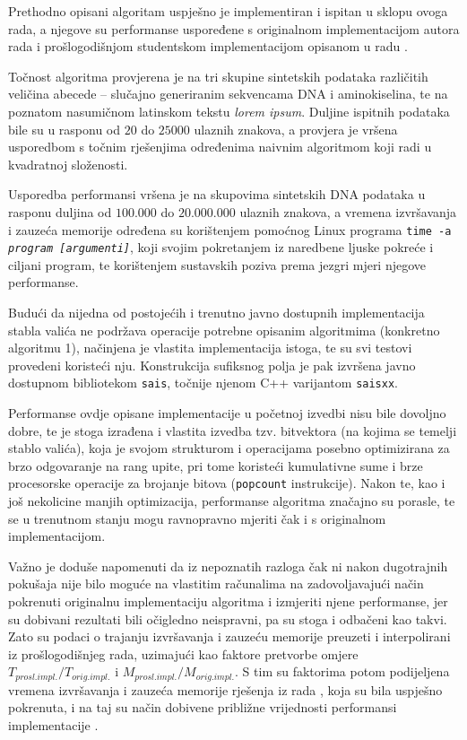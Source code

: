 \documentclass[a4paper,12pt]{article}
\begin{document}
Prethodno opisani algoritam uspješno je implementiran i ispitan u sklopu ovoga rada, a njegove su performanse uspoređene s originalnom implementacijom autora rada \cite{beller2013} i prošlogodišnjom studentskom implementacijom opisanom u radu \cite{studenti2017}.

Točnost algoritma provjerena je na tri skupine sintetskih podataka različitih veličina abecede -- slučajno generiranim sekvencama DNA i aminokiselina, te na poznatom nasumičnom latinskom tekstu \textit{lorem ipsum}. Duljine ispitnih podataka bile su u rasponu od $20$ do $25000$ ulaznih znakova, a provjera je vršena usporedbom s točnim rješenjima određenima naivnim algoritmom koji radi u kvadratnoj složenosti.

Usporedba performansi vršena je na skupovima sintetskih DNA podataka u rasponu duljina od $100.000$ do $20.000.000$ ulaznih znakova, a vremena izvršavanja i zauzeća memorije određena su korištenjem pomoćnog Linux programa \texttt{time -a \textit{program [argumenti]}}, koji svojim pokretanjem iz naredbene ljuske pokreće i ciljani program, te korištenjem sustavskih poziva prema jezgri mjeri njegove performanse.

Budući da nijedna od postojećih i trenutno javno dostupnih implementacija stabla valića ne podržava operacije potrebne opisanim algoritmima (konkretno algoritmu 1), načinjena je vlastita implementacija istoga, te su svi testovi provedeni koristeći nju. Konstrukcija sufiksnog polja je pak izvršena javno dostupnom bibliotekom \texttt{sais}, točnije njenom C++ varijantom \texttt{saisxx}.

Performanse ovdje opisane implementacije u početnoj izvedbi nisu bile dovoljno dobre, te je stoga izrađena i vlastita izvedba tzv. bitvektora (na kojima se temelji stablo valića), koja je svojom strukturom i operacijama posebno optimizirana za brzo odgovaranje na rang upite, pri tome koristeći kumulativne sume i brze procesorske operacije za brojanje bitova (\texttt{popcount} instrukcije). Nakon te, kao i još nekolicine manjih optimizacija, performanse algoritma značajno su porasle, te se u trenutnom stanju mogu ravnopravno mjeriti čak i s originalnom implementacijom.

Važno je doduše napomenuti da iz nepoznatih razloga čak ni nakon dugotrajnih pokušaja nije bilo moguće na vlastitim računalima na zadovoljavajući način pokrenuti originalnu implementaciju algoritma i izmjeriti njene performanse, jer su dobivani rezultati bili očigledno neispravni, pa su stoga i odbačeni kao takvi. Zato su podaci o trajanju izvršavanja i zauzeću memorije preuzeti i interpolirani iz prošlogodišnjeg rada, uzimajući kao faktore pretvorbe omjere $T_{prosl.impl.}/T_{orig.impl.}$ i $M_{prosl.impl.}/M_{orig.impl.}$. S tim su faktorima potom podijeljena vremena izvršavanja i zauzeća memorije rješenja iz rada \cite{studenti2017}, koja su bila uspješno pokrenuta, i na taj su način dobivene približne vrijednosti performansi implementacije \cite{beller2013}.
\end{document}
